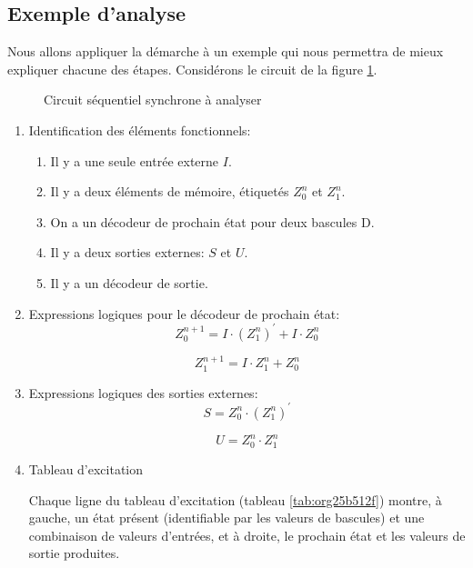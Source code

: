 \documentclass[11pt]{article}
\begin{document}
\subsection{Exemple d'analyse}
\label{sec:org0c96c9f}

Nous allons appliquer la démarche à un exemple qui nous permettra de
mieux expliquer chacune des étapes. Considérons le circuit de la
figure \ref{fig:org9143b8b}.

\begin{figure}[htbp]
\centering

\caption{\label{fig:org9143b8b}Circuit séquentiel synchrone à analyser}
\end{figure}

\begin{enumerate}
\item Identification des éléments fonctionnels:

\begin{enumerate}
\item Il y a une seule entrée externe \(I\).
\item Il y a deux éléments de mémoire, étiquetés \(Z_0^n\) et  \(Z_1^n\).
\item On a un décodeur de prochain état pour deux bascules D.
\item Il y a deux sorties externes: \(S\) et \(U\).
\item Il y a un décodeur de sortie.
\end{enumerate}

\item Expressions logiques pour le décodeur de prochain état: 
$$ Z_0^{n+1} = I \cdot (Z_1^n)^\prime  + I \cdot Z_0^n $$

$$ Z_1^{n+1} = I \cdot Z_1^n +  Z_0^n  $$

\item Expressions logiques des sorties externes:
$$ S =  Z_0^n \cdot (Z_1^{n})^\prime $$

$$ U =  Z_0^n \cdot Z_1^{n} $$

\item Tableau d'excitation

Chaque ligne du tableau d'excitation (tableau \ref{tab:org25b512f}) montre, à gauche,
un état présent (identifiable par les valeurs de bascules) et une
combinaison de valeurs d'entrées, et à droite, le prochain état et les
valeurs de sortie produites.


\end{enumerate}
\end{document}
